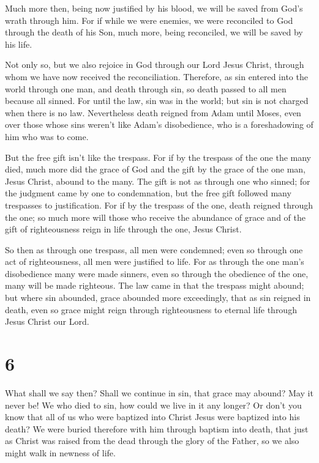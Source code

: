  Much more then, being now justified by his blood, we will
be saved from God's wrath through him.  For if while we
were enemies, we were reconciled to God through the death of his Son,
much more, being reconciled, we will be saved by his life.

 Not only so, but we also rejoice in God through our Lord
Jesus Christ, through whom we have now received the reconciliation.
 Therefore, as sin entered into the world through one
man, and death through sin, so death passed to all men because all
sinned.  For until the law, sin was in the world; but sin
is not charged when there is no law.  Nevertheless death
reigned from Adam until Moses, even over those whose sins weren't like
Adam's disobedience, who is a foreshadowing of him who was to come.

 But the free gift isn't like the trespass. For if by the
trespass of the one the many died, much more did the grace of God and
the gift by the grace of the one man, Jesus Christ, abound to the many.
 The gift is not as through one who sinned; for the
judgment came by one to condemnation, but the free gift followed many
trespasses to justification.  For if by the trespass of
the one, death reigned through the one; so much more will those who
receive the abundance of grace and of the gift of righteousness reign in
life through the one, Jesus Christ.

 So then as through one trespass, all men were condemned;
even so through one act of righteousness, all men were justified to
life.  For as through the one man's disobedience many
were made sinners, even so through the obedience of the one, many will
be made righteous.  The law came in that the trespass
might abound; but where sin abounded, grace abounded more exceedingly,
 that as sin reigned in death, even so grace might reign
through righteousness to eternal life through Jesus Christ our Lord.

\hypertarget{section-5}{%
\section{6}\label{section-5}}

 What shall we say then? Shall we continue in sin, that
grace may abound?  May it never be! We who died to sin,
how could we live in it any longer?  Or don't you know
that all of us who were baptized into Christ Jesus were baptized into
his death?  We were buried therefore with him through
baptism into death, that just as Christ was raised from the dead through
the glory of the Father, so we also might walk in newness of life.

